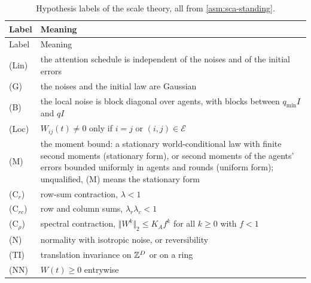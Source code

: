 \begingroup
\small
\setlength{\tabcolsep}{4pt}
\begin{longtable}{@{}>{\raggedright\arraybackslash}p{}>{\raggedright\arraybackslash}p{}@{}}
\caption{Hypothesis labels of the scale theory, all from \cref{asm:sca-standing}.}\label{tab:not-labels}\\
\toprule
Label & Meaning\\
\midrule
\endfirsthead
\toprule
Label & Meaning\\
\midrule
\endhead
\bottomrule
\endfoot
(Lin) & the attention schedule is independent of the noises and of the initial errors\\
(G) & the noises and the initial law are Gaussian\\
(B) & the local noise is block diagonal over agents, with blocks between $q_{\min}I$ and $qI$\\
(Loc) & $W_{ij}(t)\ne0$ only if $i=j$ or $(i,j)\in\mathcal E$\\
(M) & the moment bound: a stationary world-conditional law with finite second moments (stationary form), or second moments of the agents' errors bounded uniformly in agents and rounds (uniform form); unqualified, (M) means the stationary form\\
(C$_r$) & row-sum contraction, $\lambda<1$\\
(C$_{rc}$) & row and column sums, $\lambda_r\lambda_c<1$\\
(C$_\rho$) & spectral contraction, $\Vert W^k\Vert_2\le K_Af^k$ for all $k\ge0$ with $f<1$\\
(N) & normality with isotropic noise, or reversibility\\
(TI) & translation invariance on $\mathbb{Z}^D$ or on a ring\\
(NN) & $W(t)\ge0$ entrywise\\
\end{longtable}
\endgroup


